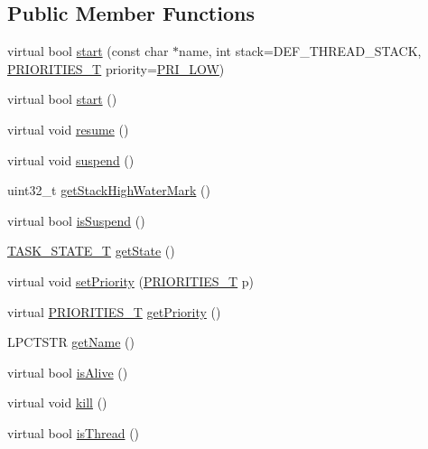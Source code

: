 \subsection*{Public Member Functions}
\begin{DoxyCompactItemize}
\item 
virtual bool \hyperlink{class_c_thread_a3ebabcc071634508511ae2fc7b868ab7}{start} (const char $\ast$name, int stack=D\-E\-F\-\_\-\-T\-H\-R\-E\-A\-D\-\_\-\-S\-T\-A\-C\-K, \hyperlink{group___enumerations_ga51e24e4c0498282f564e92975e020c1d}{P\-R\-I\-O\-R\-I\-T\-I\-E\-S\-\_\-\-T} priority=\hyperlink{group___enumerations_gga51e24e4c0498282f564e92975e020c1daf8a2513dc9a78bb09c0520af65a3f402}{P\-R\-I\-\_\-\-L\-O\-W})
\item 
virtual bool \hyperlink{class_c_thread_aacf955d1852e74da1f989251955ee6ec}{start} ()
\item 
virtual void \hyperlink{class_c_thread_ac8c53aa8c145fc4ac70fa6d825b95742}{resume} ()
\item 
virtual void \hyperlink{class_c_thread_a53e71e6db2221cd1c45aec21953d4aad}{suspend} ()
\item 
uint32\-\_\-t \hyperlink{class_c_thread_ac0227eda51725b795a461a768703f588}{get\-Stack\-High\-Water\-Mark} ()
\item 
virtual bool \hyperlink{class_c_thread_a51dbe9909ce528b4113d2cc27314e965}{is\-Suspend} ()
\item 
\hyperlink{group___enumerations_ga25ee4013cc565a18ac2f4039b4ad441b}{T\-A\-S\-K\-\_\-\-S\-T\-A\-T\-E\-\_\-\-T} \hyperlink{class_c_thread_a1e9cce461d8dfb3889cea24f1a703f6f}{get\-State} ()
\item 
virtual void \hyperlink{class_c_thread_a6b0703ae0cc085a0c0aaa55b6945575b}{set\-Priority} (\hyperlink{group___enumerations_ga51e24e4c0498282f564e92975e020c1d}{P\-R\-I\-O\-R\-I\-T\-I\-E\-S\-\_\-\-T} p)
\item 
virtual \hyperlink{group___enumerations_ga51e24e4c0498282f564e92975e020c1d}{P\-R\-I\-O\-R\-I\-T\-I\-E\-S\-\_\-\-T} \hyperlink{class_c_thread_ac30b0a1f51549a97b88771692319c0e4}{get\-Priority} ()
\item 
L\-P\-C\-T\-S\-T\-R \hyperlink{class_c_thread_aa291909bc3ff7cc0decf46c885a7a725}{get\-Name} ()
\item 
virtual bool \hyperlink{class_c_thread_a4a0f0727be4714cef1e24150a869d403}{is\-Alive} ()
\item 
virtual void \hyperlink{class_c_thread_a15041136818470124d097d790d55a6e5}{kill} ()
\item 
virtual bool \hyperlink{class_c_thread_ab2513fd0fcad30e2e6605609c91f1984}{is\-Thread} ()
\end{DoxyCompactItemize}

